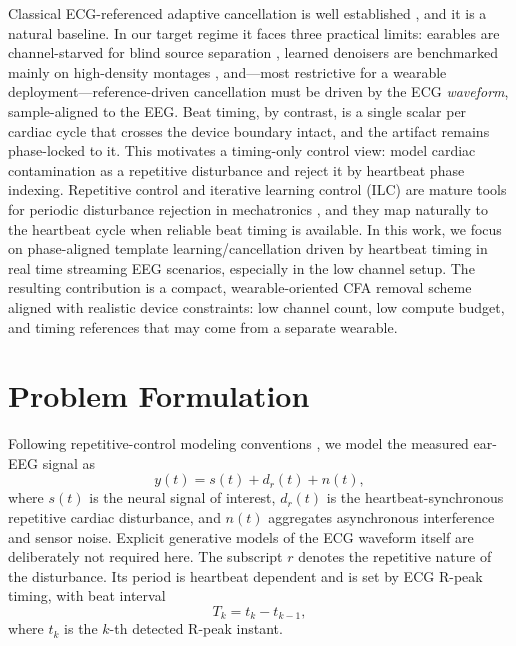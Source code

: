 \documentclass[conference]{IEEEtran}
\begin{document}
Classical ECG-referenced adaptive cancellation is well established \cite{widrow1975,haykin2014,sayed2008}, and it is a 
natural baseline. In our target regime it faces three practical limits: earables are 
channel-starved for blind source separation \cite{jung2000}, learned denoisers are benchmarked mainly on
high-density montages \cite{zhang2021}, and---most restrictive for a wearable deployment---reference-driven
cancellation must be driven by the ECG \emph{waveform}, sample-aligned to the EEG. Beat timing, by
contrast, is a single scalar per cardiac cycle that crosses the device boundary intact, and the
artifact remains phase-locked to it. This motivates a timing-only control view: model cardiac contamination as a repetitive disturbance and 
reject it by heartbeat phase indexing. Repetitive control and iterative learning control (ILC) are 
mature tools for periodic disturbance rejection in mechatronics \cite{hara1988}, 
and they map naturally to the heartbeat cycle when reliable beat timing is available. In this work, 
we focus on phase-aligned template learning/cancellation driven by heartbeat timing in real time streaming EEG scenarios,
especially in the low channel setup. The resulting contribution is a compact, wearable-oriented CFA removal scheme aligned with realistic 
device constraints: low channel count, low compute budget, and timing references that may come from a 
separate wearable. 


\section{Problem Formulation}
\label{sec:problem_formulation}

Following repetitive-control modeling conventions \cite{hara1988}\cite{longman2000}, we model 
the measured ear-EEG signal as
\begin{equation}
y(t) = s(t) + d_r(t) + n(t),
\label{eq:meas}
\end{equation}
where $s(t)$ is the neural signal of interest, $d_r(t)$ is the heartbeat-synchronous repetitive 
cardiac disturbance, and $n(t)$ aggregates asynchronous interference and sensor noise. Explicit
generative models of the ECG waveform itself \cite{sameni2007} are deliberately not required here. The subscript 
$r$ denotes the repetitive nature of the disturbance. Its period is heartbeat dependent and is set by 
ECG R-peak timing, with beat interval
\begin{equation}
T_k = t_{k} - t_{k-1},
\label{eq:Tk}
\end{equation}
where $t_k$ is the $k$-th detected R-peak instant.
\end{document}
